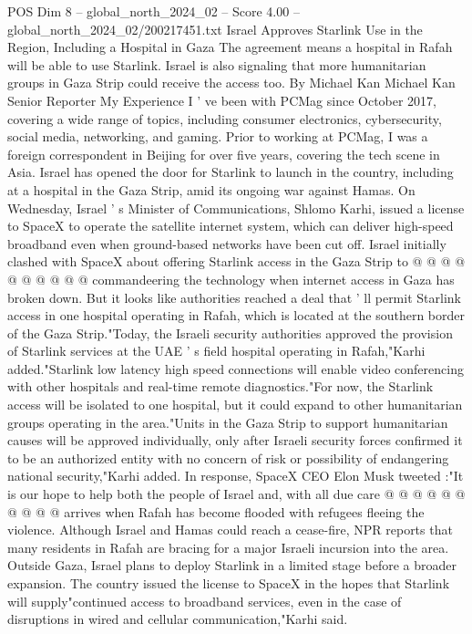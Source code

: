 \begin{textsample}{POS Dim 8 – global\_north\_2024\_02 – Score 4.00 – global\_north\_2024\_02/200217451.txt}  \label{ex:f8_pos_213}
Israel Approves Starlink Use in the Region, Including a Hospital in Gaza The agreement means a hospital in Rafah will be able to use Starlink.
Israel is also signaling that more humanitarian groups in Gaza Strip could receive the access too.
By Michael Kan Michael Kan Senior Reporter My Experience I ' ve been with PCMag since October 2017, covering a wide range of topics, including consumer electronics, cybersecurity, social media, networking, and gaming.
Prior to working at PCMag, I was a foreign correspondent in Beijing for over five years, covering the tech scene in Asia.
Israel has opened the door for Starlink to launch in the country, including at a hospital in the Gaza Strip, amid its ongoing war against Hamas.
On Wednesday, Israel ' s Minister of Communications, Shlomo Karhi, issued a license to SpaceX to operate the satellite internet system, which can deliver high-speed broadband even when ground-based networks have been cut off.
Israel initially clashed with SpaceX about offering Starlink access in the Gaza Strip to @ @ @ @ @ @ @ @ @ @ commandeering the technology when internet access in Gaza has broken down.
But it looks like authorities reached a deal that ' ll permit Starlink access in one hospital operating in Rafah, which is located at the southern border of the Gaza Strip."Today, the Israeli security authorities approved the provision of Starlink services at the UAE ' s field hospital operating in Rafah,"Karhi added."Starlink low latency high speed connections will enable video conferencing with other hospitals and real-time remote diagnostics."For now, the Starlink access will be isolated to one hospital, but it could expand to other humanitarian groups operating in the area."Units in the Gaza Strip to support humanitarian causes will be approved individually, only after Israeli security forces confirmed it to be an authorized entity with no concern of risk or possibility of endangering national security,"Karhi added.
In response, SpaceX CEO Elon Musk tweeted :"It is our hope to help both the people of Israel and, with all due care @ @ @ @ @ @ @ @ @ @ arrives when Rafah has become flooded with refugees fleeing the violence.
Although Israel and Hamas could reach a cease-fire, NPR reports that many residents in Rafah are bracing for a major Israeli incursion into the area.
Outside Gaza, Israel plans to deploy Starlink in a limited stage before a broader expansion.
The country issued the license to SpaceX in the hopes that Starlink will supply"continued access to broadband services, even in the case of disruptions in wired and cellular communication,"Karhi said.

\end{textsample}
